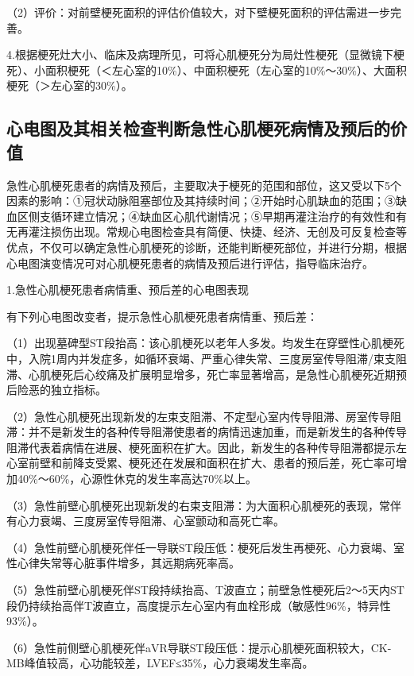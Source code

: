 （2）评价：对前壁梗死面积的评估价值较大，对下壁梗死面积的评估需进一步完善。

4.根据梗死灶大小、临床及病理所见，可将心肌梗死分为局灶性梗死（显微镜下梗死）、小面积梗死（＜左心室的10\%）、中面积梗死（左心室的10\%～30\%）、大面积梗死（＞左心室的30\%）。

\protect\hypertarget{text00052.htmlux5cux23subid633}{}{}

\subsection{心电图及其相关检查判断急性心肌梗死病情及预后的价值}

急性心肌梗死患者的病情及预后，主要取决于梗死的范围和部位，这又受以下5个因素的影响：①冠状动脉阻塞部位及其持续时间；②开始时心肌缺血的范围；③缺血区侧支循环建立情况；④缺血区心肌代谢情况；⑤早期再灌注治疗的有效性和有无再灌注损伤出现。常规心电图检查具有简便、快捷、经济、无创及可反复检查等优点，不仅可以确定急性心肌梗死的诊断，还能判断梗死部位，并进行分期，根据心电图演变情况可对心肌梗死患者的病情及预后进行评估，指导临床治疗。

1.急性心肌梗死患者病情重、预后差的心电图表现

有下列心电图改变者，提示急性心肌梗死患者病情重、预后差：

（1）出现墓碑型ST段抬高：该心肌梗死以老年人多发。均发生在穿壁性心肌梗死中，入院1周内并发症多，如循环衰竭、严重心律失常、三度房室传导阻滞/束支阻滞、心肌梗死后心绞痛及扩展明显增多，死亡率显著增高，是急性心肌梗死近期预后险恶的独立指标。

（2）急性心肌梗死出现新发的左束支阻滞、不定型心室内传导阻滞、房室传导阻滞：并不是新发生的各种传导阻滞使患者的病情迅速加重，而是新发生的各种传导阻滞代表着病情在进展、梗死面积在扩大。因此，新发生的各种传导阻滞都提示左心室前壁和前降支受累、梗死还在发展和面积在扩大、患者的预后差，死亡率可增加40\%～60\%，心源性休克的发生率高达70\%以上。

（3）急性前壁心肌梗死出现新发的右束支阻滞：为大面积心肌梗死的表现，常伴有心力衰竭、三度房室传导阻滞、心室颤动和高死亡率。

（4）急性前壁心肌梗死伴任一导联ST段压低：梗死后发生再梗死、心力衰竭、室性心律失常等心脏事件增多，其远期病死率高。

（5）急性前壁心肌梗死伴ST段持续抬高、T波直立；前壁急性梗死后2～5天内ST段仍持续抬高伴T波直立，高度提示左心室内有血栓形成（敏感性96\%，特异性93\%）。

（6）急性前侧壁心肌梗死伴aVR导联ST段压低：提示心肌梗死面积较大，CK-MB峰值较高，心功能较差，LVEF≤35\%，心力衰竭发生率高。

